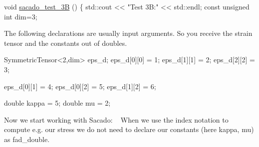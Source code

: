 \begin{DoxyCode}
\textcolor{keywordtype}{void} \hyperlink{Sacado__example_8cc_ae63cc8526935cb0512668e83cfc7b929}{sacado\_test\_3B} ()
\{
    std::cout << \textcolor{stringliteral}{"Test 3B:"} << std::endl;
    \textcolor{keyword}{const} \textcolor{keywordtype}{unsigned} \textcolor{keywordtype}{int} dim=3;
\end{DoxyCode}
 The following declarations are usually input arguments. So you receive the strain tensor and the constants out of doubles. 
\begin{DoxyCode}
SymmetricTensor<2,dim> eps\_d;
eps\_d[0][0] = 1;
eps\_d[1][1] = 2;
eps\_d[2][2] = 3;

eps\_d[0][1] = 4;
eps\_d[0][2] = 5;
eps\_d[1][2] = 6;

\textcolor{keywordtype}{double} kappa = 5;
\textcolor{keywordtype}{double} mu = 2;
\end{DoxyCode}
 Now we start working with Sacado\+: ~\newline
When we use the index notation to compute e.\+g. our stress we do not need to declare our constants (here kappa, mu) as fad\+\_\+double.

